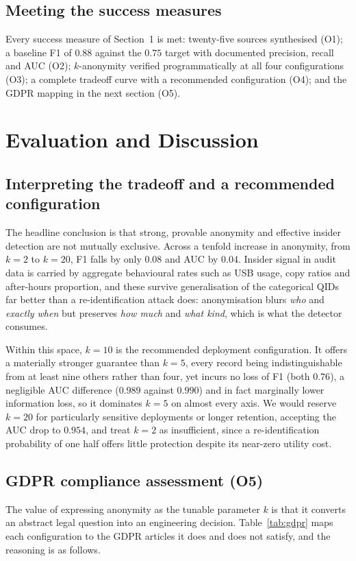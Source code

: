 \documentclass[10pt,a4paper]{article}
\begin{document}
\subsection{Meeting the success measures}
Every success measure of Section~1 is met: twenty-five sources synthesised (O1); a baseline F1 of $0.88$ against the $0.75$ target with documented precision, recall and AUC (O2); $k$-anonymity verified programmatically at all four configurations (O3); a complete tradeoff curve with a recommended configuration (O4); and the GDPR mapping in the next section (O5).

\section{Evaluation and Discussion}
\label{sec:eval}

\subsection{Interpreting the tradeoff and a recommended configuration}
The headline conclusion is that strong, provable anonymity and effective insider detection are not mutually exclusive. Across a tenfold increase in anonymity, from $k=2$ to $k=20$, F1 falls by only $0.08$ and AUC by $0.04$. Insider signal in audit data is carried by aggregate behavioural rates such as USB usage, copy ratios and after-hours proportion, and these survive generalisation of the categorical QIDs far better than a re-identification attack does: anonymisation blurs \emph{who} and \emph{exactly when} but preserves \emph{how much} and \emph{what kind}, which is what the detector consumes.

Within this space, $k=10$ is the recommended deployment configuration. It offers a materially stronger guarantee than $k=5$, every record being indistinguishable from at least nine others rather than four, yet incurs no loss of F1 (both $0.76$), a negligible AUC difference ($0.989$ against $0.990$) and in fact marginally lower information loss, so it dominates $k=5$ on almost every axis. We would reserve $k=20$ for particularly sensitive deployments or longer retention, accepting the AUC drop to $0.954$, and treat $k=2$ as insufficient, since a re-identification probability of one half offers little protection despite its near-zero utility cost.

\subsection{GDPR compliance assessment (O5)}
\label{sec:gdpr}
The value of expressing anonymity as the tunable parameter $k$ is that it converts an abstract legal question into an engineering decision. Table~\ref{tab:gdpr} maps each configuration to the GDPR articles it does and does not satisfy, and the reasoning is as follows.
\end{document}
